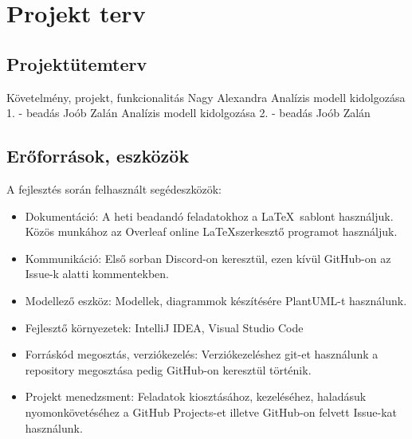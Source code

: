 \section{Projekt terv}
\subsection{Projektütemterv}
\begin{terv}
		  {Követelmény, projekt, funkcionalitás}{ Nagy Alexandra }
         { Analízis modell kidolgozása 1. - beadás }{ Joób Zalán } 
         { Analízis modell kidolgozása 2. - beadás }{ Joób Zalán }
\end{terv}
\subsection{Erőforrások, eszközök}
A fejlesztés során felhasznált segédeszközök:
\begin{itemize}
	\item Dokumentáció: A heti beadandó feladatokhoz a \LaTeX\ sablont használjuk. Közös munkához az Overleaf online \LaTeX szerkesztő programot használjuk.
	\item Kommunikáció: Első sorban Discord-on keresztül, ezen kívül GitHub-on az Issue-k alatti kommentekben.
	\item Modellező eszköz: Modellek, diagrammok készítésére PlantUML-t használunk.
	\item Fejlesztő környezetek: IntelliJ IDEA, Visual Studio Code
	\item Forráskód megosztás, verziókezelés: Verziókezeléshez git-et használunk a repository megosztása pedig GitHub-on keresztül történik.
	\item Projekt menedzsment: Feladatok kiosztásához, kezeléséhez, haladásuk nyomonkövetéséhez a GitHub Projects-et illetve GitHub-on felvett Issue-kat használunk.
\end{itemize}
